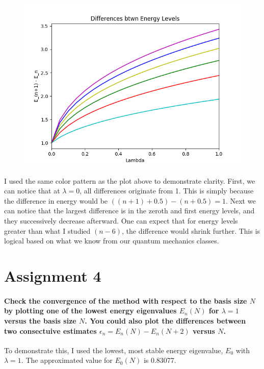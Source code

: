 \documentclass[12pt]{article}
\begin{document}
\begin{figure}[H]
\begin{center}
\includegraphics[scale=0.8]{diff_energy.png}
\end{center}
\end{figure}

I used the same color pattern as the plot above to demonstrate clarity. First, we can notice that at $\lambda=0$, all differences originate from 1. This is simply because the difference in energy would be $((n+1)+0.5) - (n + 0.5) = 1$. Next we can notice that the largest difference is in the zeroth and first energy levels, and they successively decrease afterward. One can expect that for energy levels greater than what I studied $(n-6)$, the difference would shrink further. This is logical based on what we know from our quantum mechanics classes.


\section{Assignment 4}

\paragraph{Check the convergence of the method with respect to the basis size $N$ by plotting one of the lowest energy eigenvalues $E_n(N)$ for $\lambda = 1$ versus the basis size $N$. You could also plot the differences between two consectuive estimates $\epsilon_n = E_n(N) - E_n(N+2)$ versus $N$.}

To demonstrate this, I used the lowest, most stable energy eigenvalue, $E_0$ with $\lambda = 1$. The approximated value for $E_0(N)$ is 0.83077.
\end{document}
